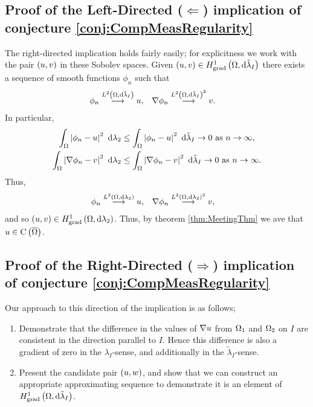 \documentclass[11pt]{report}
\theoremstyle{plain}
\newcommand{\tlambda}{\tilde{\lambda}}
\begin{document}
\subsection*{Proof of the Left-Directed ($\Leftarrow$) implication of conjecture \ref{conj:CompMeasRegularity}}
The right-directed implication holds fairly easily; for explicitness we work with the pair $\left( u,v \right)$ in these Sobolev spaces.
Given $\bracs{u,v}\in\gradSob{\ddom}{\tlambda_I}$ there exists a sequence of smooth functions $\phi_n$ such that
\begin{align*}
	\phi_n \lconv{\ltwo{\ddom}{\tlambda_I}} u, &\quad \grad\phi_n \lconv{\ltwo{\ddom}{\tlambda_I}^2} v.
\end{align*}
In particular,
\begin{align*}
	\integral{\ddom}{\abs{\phi_n - u}^2}{\lambda_2} &\leq \integral{\ddom}{\abs{\phi_n - u}^2}{\tlambda_I} \rightarrow 0 \toInfty{n}, \\
	\integral{\ddom}{\abs{\grad\phi_n - v}^2}{\lambda_2} &\leq \integral{\ddom}{\abs{\grad\phi_n - v}^2}{\tlambda_I} \rightarrow 0 \toInfty{n}.
\end{align*}
Thus,
\begin{align*}
	\phi_n \overset{L^{2}\left( \Omega,\mathrm{d}\lambda_2 \right)}{\longrightarrow} u, &\quad \nabla\phi_n \overset{L^{2}\left( \Omega,\mathrm{d}\lambda_2 \right)^2}{\longrightarrow} v,
\end{align*}
and so $\left( u,v \right)\in H^1_\mathrm{grad}\left( \Omega, \mathrm{d}\lambda_2 \right)$.
Thus, by theorem \ref{thm:MeetingThm} we ave that $u\in\mathrm{C}\left( \overline{\Omega} \right)$. \newline

\subsection*{Proof of the Right-Directed ($\Rightarrow$) implication of conjecture \ref{conj:CompMeasRegularity}}
Our approach to this direction of the implication is as follows;
\begin{enumerate}
	\item Demonstrate that the difference in the values of $\nabla u$ from $\Omega_1$ and $\Omega_2$ on $I$ are consistent in the direction parallel to $I$.
	Hence this difference is also a gradient of zero in the $\lambda_I$-sense, and additionally in the $\tlambda_I$-sense.
	\item Present the candidate pair $\left( u,w \right)$, and show that we can construct an appropriate approximating sequence to demonstrate it is an element of $\gradSob{\ddom}{\tlambda_I}$.
\end{enumerate}
\end{document}
